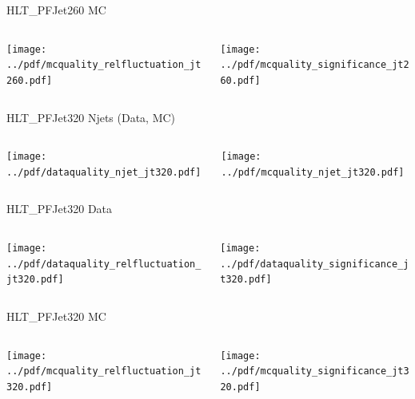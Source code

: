 \documentclass[9pt]{beamer}
\begin{document}
\begin{frame}[t]{HLT\_PFJet260 MC}
\begin{columns}[T]
  \begin{column}{.5\textwidth}
  \texttt{[image: ../pdf/mcquality\_relfluctuation\_jt260.pdf]}
  \end{column}
  \begin{column}{.5\textwidth}
  \texttt{[image: ../pdf/mcquality\_significance\_jt260.pdf]}
  \end{column}
\end{columns}
\end{frame}

\begin{frame}[t]{HLT\_PFJet320 Njets (Data, MC)}
\begin{columns}[T]
  \begin{column}{.5\textwidth}
  \texttt{[image: ../pdf/dataquality\_njet\_jt320.pdf]}
  \end{column}
  \begin{column}{.5\textwidth}
  \texttt{[image: ../pdf/mcquality\_njet\_jt320.pdf]}
  \end{column}
\end{columns}
\end{frame}

\begin{frame}[t]{HLT\_PFJet320 Data}
\begin{columns}[T]
  \begin{column}{.5\textwidth}
  \texttt{[image: ../pdf/dataquality\_relfluctuation\_jt320.pdf]}
  \end{column}
  \begin{column}{.5\textwidth}
  \texttt{[image: ../pdf/dataquality\_significance\_jt320.pdf]}
  \end{column}
\end{columns}
\end{frame}

\begin{frame}[t]{HLT\_PFJet320 MC}
\begin{columns}[T]
  \begin{column}{.5\textwidth}
  \texttt{[image: ../pdf/mcquality\_relfluctuation\_jt320.pdf]}
  \end{column}
  \begin{column}{.5\textwidth}
  \texttt{[image: ../pdf/mcquality\_significance\_jt320.pdf]}
  \end{column}
\end{columns}
\end{frame}
\end{document}
